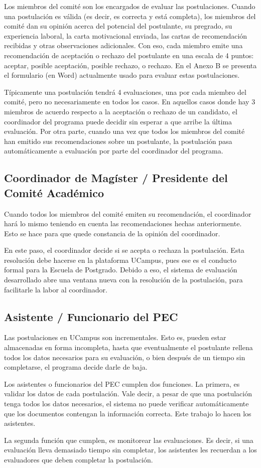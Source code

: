 Los miembros del comité son los encargados de evaluar las postulaciones. Cuando
una postulación es válida (es decir, es correcta y está completa), los miembros
del comité dan su opinión acerca del potencial del postulante, su pregrado, su
experiencia laboral, la carta motivacional enviada, las cartas de recomendación
recibidas y otras observaciones adicionales. Con eso, cada miembro emite una
recomendación de aceptación o rechazo del postulante en una escala de 4 puntos:
aceptar, posible aceptación, posible rechazo, o rechazo. En el Anexo B se
presenta el formulario (en Word) actualmente usado para evaluar estas
postulaciones.

Típicamente una postulación tendrá 4 evaluaciones, una por cada miembro del
comité, pero no necesariamente en todos los casos. En aquellos casos donde hay 3
miembros de acuerdo respecto a la aceptación o rechazo de un candidato, el
coordinador del programa puede decidir sin esperar a que arribe la última
evaluación. Por otra parte, cuando una vez que todos los miembros del comité han
emitido sus recomendaciones sobre un postulante, la postulación pasa
automáticamente a evaluación por parte del coordinador del programa.

\subsection{Coordinador de Magíster / Presidente del Comité Académico}

Cuando todos los miembros del comité emiten su recomendación, el coordinador
hará lo mismo teniendo en cuenta las recomendaciones hechas anteriormente. Esto
se hace para que quede constancia de la opinión del coordinador.

En este paso, el coordinador decide si se acepta o rechaza la postulación. Esta
resolución debe hacerse en la plataforma UCampus, pues ese es el conducto formal
para la Escuela de Postgrado. Debido a eso, el sistema de evaluación
desarrollado abre una ventana nueva con la resolución de la postulación, para
facilitarle la labor al coordinador.

\subsection{Asistente / Funcionario del PEC}

Las postulaciones en UCampus son incrementales. Esto es, pueden estar
almacenadas en forma incompleta, hasta que eventualmente el postulante rellena
todos los datos necesarios para su evaluación, o bien después de un tiempo sin
completarse, el programa decide darle de baja.

Los asistentes o funcionarios del PEC cumplen dos funciones. La primera, es
validar los datos de cada postulación. Vale decir, a pesar de que una
postulación tenga todos los datos necesarios, el sistema no puede verificar
automáticamente que los documentos contengan la información correcta. Este
trabajo lo hacen los asistentes.

La segunda función que cumplen, es monitorear las evaluaciones. Es decir, si una
evaluación lleva demasiado tiempo sin completar, los asistentes les recuerdan a
los evaluadores que deben completar la postulación.
